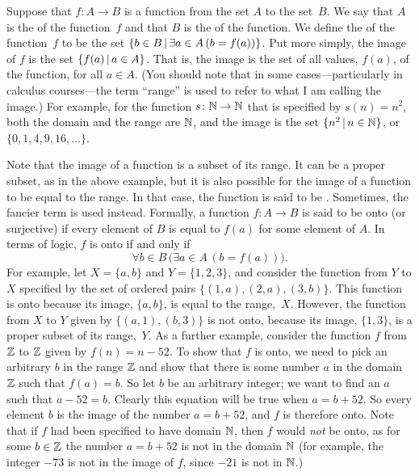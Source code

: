 \medbreak

Suppose that $f\colon A\to B$ is a function from the set
$A$ to the set~$B$.  We say that $A$ is the  of
the function~$f$ and that $B$ is the  of the function.
We define the  of the function~$f$ to be the
set $\{b\in B\,|\, \exists a\in A\,(b=f(a))\}$.  Put
more simply, the image of $f$ is the set $\{f(a)\,|\, a\in A\}$.
That is, the image is the set of all values, $f(a)$, of the
function, for all $a\in A$.  (You should note that in some
cases---particularly in calculus courses---the term ``range''
is used to refer to what I am calling the image.)
For example, for the function $s\colon{\mathbb N}\to{\mathbb N}$ that is specified
by $s(n)=n^2$, both the domain and the range are ${\mathbb N}$, and
the image is the set $\{n^2\,|\, n\in{\mathbb N}\}$, or $\{0,1,4,9,16,\dots\}$.

Note that the image of a function is a subset of its range.
It can be a proper subset, as in the above example, but it is
also possible for the image of a function to be equal to
the range.  In that case, the function is said to be
.  Sometimes, the fancier term
 is used instead.  Formally, a function
$f\colon A\to B$ is said to be onto (or surjective) if
every element of $B$ is equal to $f(a)$ for some element of
$A$.  In terms of logic, $f$ is onto if and only if
\[\forall b\in B\,\big(\exists a\in A\, (b=f(a))\big).\]
For example, let $X=\{a,b\}$ and $Y=\{1,2,3\}$, and consider
the function from $Y$ to $X$ specified by the set of ordered
pairs $\{(1,a),(2,a),(3,b)\}$.  This function is onto because
its image, $\{a,b\}$, is equal to the range,~$X$. However,
the function from $X$ to $Y$ given by $\{(a,1),(b,3)\}$ is not
onto, because its image, $\{1,3\}$, is a proper subset of
its range,~$Y$.  As a further example, consider the function
$f$ from ${\mathbb Z}$ to ${\mathbb Z}$ given by $f(n) = n-52$.  To show that $f$
is onto, we need to pick an arbitrary $b$ in the range ${\mathbb Z}$
and show that there is some number $a$ in the domain ${\mathbb Z}$
such that $f(a) = b$.  So let $b$ be an arbitrary integer;
we want to find an $a$ such that $a-52=b$.  Clearly this equation
will be true when $a=b+52$.  So every element $b$ is the image
of the number $a=b+52$, and $f$ is therefore onto.  Note that if
$f$ had been specified to have domain ${\mathbb N}$, then $f$ would
\emph{not} be onto, as for some $b \in {\mathbb Z}$ the number $a=b+52$
is not in the domain ${\mathbb N}$ (for example, the integer $-73$ is
not in the image of $f$, since $-21$ is not in ${\mathbb N}$.)

